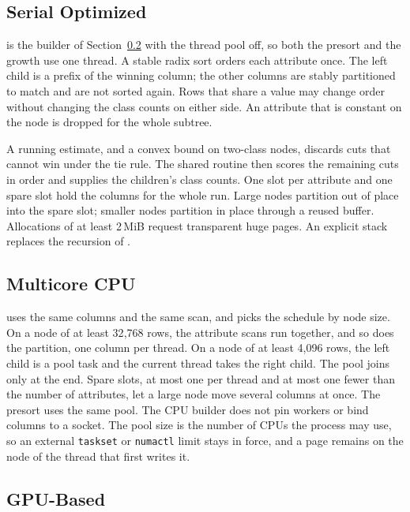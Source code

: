\subsection{Serial Optimized}
\label{sec:impl-serial}

\ImplSerialOpt{} is the builder of Section~\ref{sec:impl-parallel} with the thread pool off, so both the presort and the growth use one thread. A stable radix sort orders each attribute once. The left child is a prefix of the winning column; the other columns are stably partitioned to match and are not sorted again. Rows that share a value may change order without changing the class counts on either side. An attribute that is constant on the node is dropped for the whole subtree.

A running estimate, and a convex bound on two-class nodes, discards cuts that cannot win under the tie rule. The shared routine then scores the remaining cuts in order and supplies the children's class counts. One slot per attribute and one spare slot hold the columns for the whole run. Large nodes partition out of place into the spare slot; smaller nodes partition in place through a reused buffer. Allocations of at least 2\,MiB request transparent huge pages. An explicit stack replaces the recursion of \ImplSerialBase{}.

\subsection{Multicore CPU}
\label{sec:impl-parallel}

\ImplParallel{} uses the same columns and the same scan, and picks the schedule by node size. On a node of at least 32{,}768 rows, the attribute scans run together, and so does the partition, one column per thread. On a node of at least 4{,}096 rows, the left child is a pool task and the current thread takes the right child. The pool joins only at the end. Spare slots, at most one per thread and at most one fewer than the number of attributes, let a large node move several columns at once. The presort uses the same pool. The CPU builder does not pin workers or bind columns to a socket. The pool size is the number of CPUs the process may use, so an external \texttt{taskset} or \texttt{numactl} limit stays in force, and a page remains on the node of the thread that first writes it.

\subsection{GPU-Based}
\label{sec:impl-gpu}

